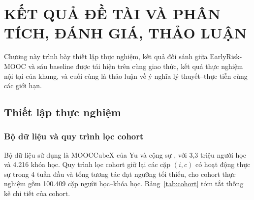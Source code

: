 \chapter{KẾT QUẢ ĐỀ TÀI VÀ PHÂN TÍCH, ĐÁNH GIÁ, THẢO LUẬN}
\label{ch:ketqua}

Chương này trình bày thiết lập thực nghiệm, kết quả đối sánh giữa EarlyRisk-MOOC và sáu baseline được tái hiện trên cùng giao thức, kết quả thực nghiệm nội tại của khung, và cuối cùng là thảo luận về ý nghĩa lý thuyết--thực tiễn cùng các giới hạn.

\section{Thiết lập thực nghiệm}
\label{sec:thietlap}

\subsection{Bộ dữ liệu và quy trình lọc cohort}

Bộ dữ liệu sử dụng là MOOCCubeX của Yu và cộng sự \cite{Yu2021}, với 3,3 triệu người học và 4.216 khóa học. Quy trình lọc cohort giữ lại các cặp $(i, c)$ có hoạt động thực sự trong 4 tuần đầu và tổng tương tác đạt ngưỡng tối thiểu, cho cohort thực nghiệm gồm 100.409 cặp người học--khóa học. Bảng~\ref{tab:cohort} tóm tắt thống kê chi tiết của cohort.


